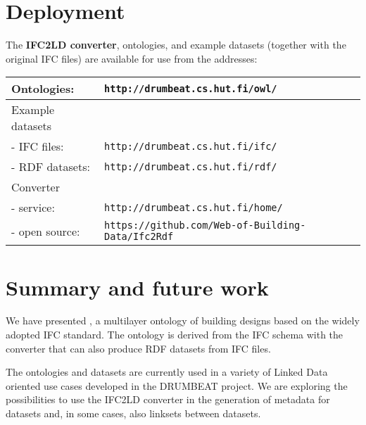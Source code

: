 \section{Deployment}

The \textbf{IFC2LD converter}, \ifcowl{} ontologies, and example \ifcrdf{} datasets (together with the original IFC files) are available for use from the addresses:

\vspace{2mm}
\begin{tabular}{|l|l|}
\hline
Ontologies: & \texttt{http://drumbeat.cs.hut.fi/owl/} \\
\hline
Example datasets & \\
- IFC files: & \texttt{http://drumbeat.cs.hut.fi/ifc/} \\
- RDF datasets: & \texttt{http://drumbeat.cs.hut.fi/rdf/} \\
\hline
Converter & \\
- service: & \texttt{http://drumbeat.cs.hut.fi/home/} \\
- open source: & \texttt{https://github.com/Web-of-Building-Data/Ifc2Rdf} \\
\hline
\end{tabular}


\section{Summary and future work}
\label{sec:conclusion}

We have presented \ifcowl{}, a multilayer ontology of building designs based on the widely adopted IFC standard. The ontology is 
derived from the IFC schema with the  converter that can also produce RDF datasets from IFC files. 

The \ifcowl{} ontologies and \ifcrdf{} datasets are currently used in a variety of Linked Data oriented use cases \cite{torma2013semantic} developed in the DRUMBEAT project. We are exploring the possibilities to use the IFC2LD converter in the generation of metadata for \ifcrdf{} datasets and, in some cases, also linksets between datasets.


